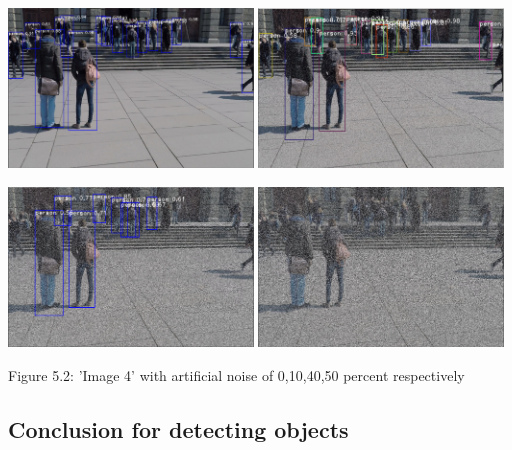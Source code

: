 \documentclass[12pt]{report}
\begin{document}
\begin{center}
	\includegraphics[width=65mm]{./images/image45050.PNG}
	\includegraphics[width=65mm]{./images/appendix/imageAugment720pSandP.PNG}
	
	\vspace{2mm}
	\hspace{0.3mm}
	\includegraphics[width=65mm]{./images/appendix/imageAugment0.4SandP.PNG}
	\includegraphics[width=65mm]{./images/appendix/imageAugment0.5SandP.PNG}
	\vspace{3mm}
	
	{\footnotesize Figure 5.2: 'Image 4' with artificial noise of 0,10,40,50 percent respectively}
\end{center}


\subsection{Conclusion for detecting objects}
\end{document}
